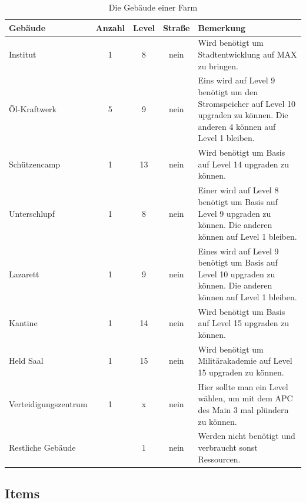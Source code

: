 \documentclass[fontsize=12pt,a4paper]{scrartcl}[2003/01/01]
\begin{document}
\begin{table}[h!]
  \centering
\begin{tabularx}{1.0\textwidth}{lcccX}
  Gebäude & Anzahl & Level & Straße & Bemerkung \\
  \hline
  Institut & 1 & 8 & nein & Wird benötigt um Stadtentwicklung auf MAX zu bringen. \\
  Öl-Kraftwerk & 5 & 9 & nein & Eins wird auf Level 9 benötigt um den Stromspeicher auf Level 10 upgraden zu können. 
                                Die anderen 4 können auf Level 1 bleiben.\\
  Schützencamp & 1 & 13 & nein & Wird benötigt um Basis auf Level 14 upgraden zu können. \\
  Unterschlupf & 1 & 8 & nein & Einer wird auf Level 8 benötigt um Basis auf Level 9 upgraden zu können.
                                Die anderen können auf Level 1 bleiben.\\
  Lazarett & 1 & 9 & nein & Eines wird auf Level 9 benötigt um Basis auf Level 10 upgraden zu können.
                            Die anderen können auf Level 1 bleiben.\\
  Kantine & 1 & 14 & nein & Wird benötigt um Basis auf Level 15 upgraden zu können. \\
  Held Saal & 1 & 15 & nein & Wird benötigt um Militärakademie auf Level 15 upgraden zu können. \\
  Verteidigungszentrum & 1 & x & nein & Hier sollte man ein Level wählen, um mit dem APC des Main 3 mal plündern zu können. \\
  Restliche Gebäude & ~ & 1 & nein & Werden nicht benötigt und verbraucht sonst Ressourcen. \\
\end{tabularx}
\caption[Gebäude]{Die Gebäude einer Farm}
\end{table}



\subsection{Items}
\end{document}
